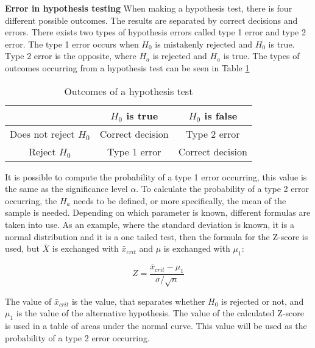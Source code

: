 \noindent \textbf{Error in hypothesis testing}
\newline
When making a hypothesis test, there is four different possible outcomes. The results are separated by correct decisions and errors. There exists two types of hypothesis errors called type 1 error and type 2 error. The type 1 error occurs when $H_0$ is mistakenly rejected and $H_0$ is true. Type 2 error is the opposite, where $H_a$ is rejected and $H_a$ is true. The types of outcomes occurring from a hypothesis test can be seen in Table \ref{tab:example2x3}
\begin{table}[h!]
	\centering
	\begin{tabular}{|c|c|c|}
		\hline
		 & $H_0$ is true & $H_0$ is false \\
		\hline
		Does not reject $H_0$ & Correct decision & Type 2 error \\ \hline
		Reject $H_0$ & Type 1 error & Correct decision \\
		\hline
	\end{tabular}
	\caption{Outcomes of a hypothesis test}
	\label{tab:example2x3}
\end{table}

\noindent It is possible to compute the probability of a type 1 error occurring, this value is the same as the significance level $\alpha$. To calculate the probability of a type 2 error occurring, the $H_a$ needs to be defined, or more specifically, the mean of the sample is needed. Depending on which parameter is known, different formulas are taken into use. As an example, where the standard deviation is known, it is a normal distribution and it is a one tailed test, then the formula for the Z-score is used, but $\bar{X}$ is exchanged with $\bar{x}_{crit}$ and $\mu$ is exchanged with $\mu_1$:

\begin{equation}
Z=\frac{\bar{x}_{crit}-\mu_1}{\sigma/\sqrt{n}}
\end{equation}


\noindent The value of $\bar{x}_{crit}$ is the value, that separates whether $H_0$ is rejected or not, and $\mu_1$ is the value of the alternative hypothesis.
The value of the calculated Z-score is used in a table of areas under the normal curve. This value will be used as the probability of a type 2 error occurring.


